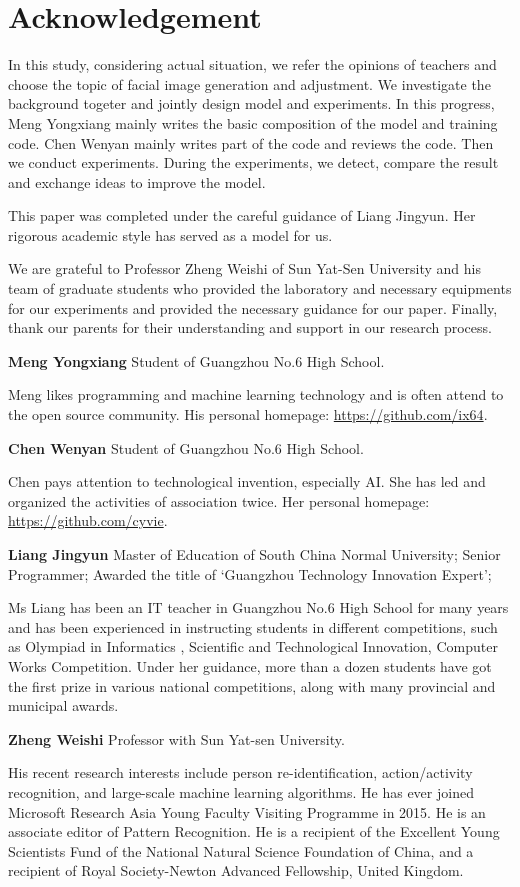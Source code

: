 \section*{Acknowledgement}

In this study, considering actual situation, we refer the opinions of teachers and choose the topic of facial image generation and adjustment. We investigate the background togeter and jointly design model and experiments. In this progress, Meng Yongxiang mainly writes the basic composition of the model and training code. Chen Wenyan mainly writes part of the code and reviews the code. Then we conduct experiments. During the experiments, we detect, compare the result and exchange ideas to improve the model.

This paper was completed under the careful guidance of Liang Jingyun. Her rigorous academic style has served as a model for us.

We are grateful to Professor Zheng Weishi of Sun Yat-Sen University and his team of graduate students who provided the laboratory and necessary equipments for our experiments and provided the necessary guidance for our paper.
Finally, thank our parents for their understanding and support in our research process.

\vspace{4ex}


\textbf{Meng Yongxiang}  Student of Guangzhou No.6 High School.

Meng likes programming and machine learning technology and is often attend to the open source community. His personal homepage: \url{https://github.com/ix64}.


\textbf{Chen Wenyan}  Student of Guangzhou No.6 High School.

Chen pays attention to technological invention, especially AI. She has led and organized the activities of association twice. Her personal homepage: \url{https://github.com/cyvie}.


\textbf{Liang Jingyun}  Master of Education of South China Normal University;
Senior Programmer;
Awarded the title of ‘Guangzhou Technology Innovation Expert’;

Ms Liang has been an IT teacher in Guangzhou No.6 High School for many years and has been experienced in instructing students in different competitions, such as Olympiad in Informatics , Scientific and Technological Innovation, Computer Works Competition. Under her guidance, more than a dozen students have got the first prize in various national competitions, along with many provincial and municipal awards.


\textbf{Zheng Weishi}  Professor with Sun Yat-sen University.

His recent research interests include person re-identification, action/activity recognition, and large-scale machine learning algorithms.
He has ever joined Microsoft Research Asia Young Faculty Visiting Programme in 2015.
He is an associate editor of Pattern Recognition.
He is a recipient of the Excellent Young Scientists Fund of the National Natural Science Foundation of China,
    and a recipient of Royal Society-Newton Advanced Fellowship, United Kingdom.

